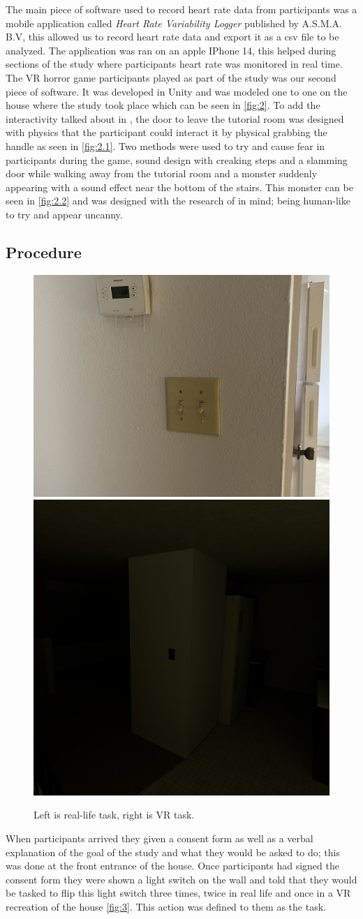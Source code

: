 \documentclass[manuscript,screen,review]{acmart}
\begin{document}
The main piece of software used to record heart rate data from participants was a mobile application called \textit{Heart Rate Variability Logger} published by A.S.M.A. B.V, this allowed us to record heart rate data and export it as a csv file to be analyzed. The application was ran on an apple IPhone 14, this helped during sections of the study where participants heart rate was monitored in real time. 
The VR horror game participants played as part of the study was our second piece of software. It was developed in Unity and was modeled one to one on the house where the study took place which can be seen in \autoref{fig:2}. To add the interactivity talked about in \cite{10.1145/3582437.3582482}, the door to leave the tutorial room was designed with physics that the participant could interact it by physical grabbing the handle as seen in \autoref{fig:2.1}. Two methods were used to try and cause fear in participants during the game, sound design with creaking steps and a slamming door while walking away from the tutorial room and a monster suddenly appearing with a sound effect near the bottom of the stairs. This monster can be seen in \autoref{fig:2.2} and was designed with the research of \cite{intel:/content/journals/10.1386/jgvw.2.1.3_1} in mind; being human-like to try and appear uncanny.

\subsection{Procedure}
\begin{figure}
    \centering
    \includegraphics[width=0.25\linewidth]{light-house.jpg}
    \includegraphics[width=0.25\linewidth]{light-game.png}
    \caption{Left is real-life task, right is VR task.}
    \label{fig:3}
\end{figure}
When participants arrived they given a consent form as well as a verbal explanation of the goal of the study and what they would be asked to do; this was done at the front entrance of the house. Once participants had signed the consent form they were shown a light switch on the wall and told that they would be tasked to flip this light switch three times, twice in real life and once in a VR recreation of the house \autoref{fig:3}. This action was defined to them as the task.
\end{document}
